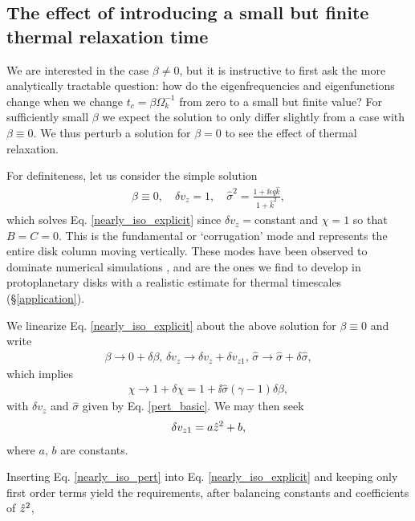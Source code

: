 \subsection{The effect of introducing a small but finite
  thermal relaxation time}\label{relax_pert}
We are interested in the case $\beta\neq 0$, but it is instructive to
first ask  the more analytically tractable question: how 
do the eigenfrequencies and eigenfunctions change when we change
$t_c=\beta\Omega_k^{-1}$ from zero to a small but finite value? For 
sufficiently small $\beta$ %
we expect the solution to only differ slightly from a case with
$\beta\equiv 0$. We thus perturb a solution for $\beta=0$ to see the
effect of thermal relaxation.  

For definiteness, let us consider the simple solution 
\begin{align}
  \beta\equiv 0, \quad \delta v_z = 1,\quad \hat{\sigma}^2 = \frac{1 +
  \ii\epsilon q \hat{k}}{1+\hat{k}^2}, \label{pert_basic} 
\end{align}
which solves Eq. \ref{nearly_iso_explicit} since $\delta
v_z=$constant and $\chi=1$ so that $B=C=0$. 
This is the fundamental or `corrugation' mode and represents
the entire disk column moving vertically. These modes have been
observed to dominate numerical simulations \citep{nelson13,stoll14},
and are the ones we find to develop in protoplanetary disks
with a realistic estimate for thermal timescales
(\S\ref{application}). 

We linearize Eq. \ref{nearly_iso_explicit} about the above
solution for $\beta\equiv0$ and write 
\begin{align}\label{nearly_iso_pert}
  \beta \to 0 + \delta\beta,\, \delta v_z\to \delta v_z+\delta
  v_{z1},\,\hat{\sigma} \to \hat{\sigma} + \delta\hat{\sigma}, 
\end{align}
which implies 
\begin{align}
  \chi \to 1 + \delta\chi = 1 + \ii \hat{\sigma}\left(\gamma-1\right)\delta\beta,
\end{align}
with $\delta v_z$ and $\hat{\sigma}$ given by Eq. \ref{pert_basic}. We
may then seek  
\begin{align}
  \delta v_{z1} = a \hat{z}^2 + b,
\end{align}
where $a$, $b$ are constants. 

Inserting Eq. \ref{nearly_iso_pert} into Eq. \ref{nearly_iso_explicit}
and keeping only first order terms yield the requirements, after
balancing constants and coefficients of $\hat{z}^2$, 

